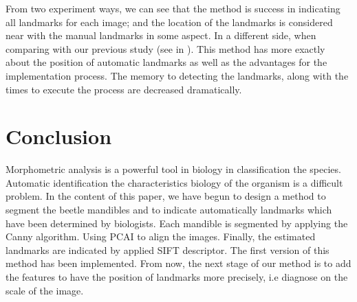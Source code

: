 \documentclass[twoside,twocolumn,10pt]{article}
\begin{document}
From two experiment ways, we can see that the method is success in
indicating all landmarks for each image; and the location of the
landmarks is considered near with the manual landmarks in some
aspect. In a different side, when comparing with our previous study (see in
\cite{leestimating}). This method has more exactly about the position of
automatic landmarks as well as the advantages for the implementation
process. The memory to detecting the landmarks, along with the times
to execute the process are decreased dramatically.

\section{Conclusion}
Morphometric analysis is a powerful tool in biology in classification
the species. Automatic identification the characteristics biology of
the organism is a difficult problem. In the content of this paper, we
have begun to design a method to segment the beetle mandibles and to
indicate automatically landmarks which have been determined by
biologists. Each mandible is segmented by applying the Canny
algorithm. Using PCAI to align the images. Finally, the estimated landmarks are indicated by applied SIFT descriptor. The first version of this method
has been implemented. From now, the next stage of our method is to add
the features to have the position of landmarks more precisely, i.e diagnose on the scale of the image.




\end{document}
